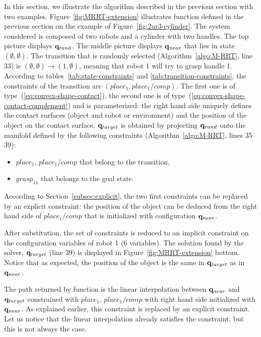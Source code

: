 In this section, we illustrate the algorithm described in the previous section with two examples. Figure~\ref{fig:MRRT-extension} illustrates function \EXTEND defined in the previous section on the example of Figure~\ref{fig:2ur3-cylinder}.
The system considered is
composed of two robots and a cylinder with two handles. The top picture displays
$\mathbf{q}_{rand}$. The middle picture displays $\mathbf{q}_{near}$ that lies in state
$(\emptyset,\emptyset)$. The transition that is randomly selected
(Algorithm~\ref{algo:M-RRT}, line 33) is
$(\emptyset,\emptyset) \rightarrow (1,\emptyset)$, meaning that robot 1 will
try to grasp handle 1. According to tables~\ref{tab:state-constraints} and
\ref{tab:transition-constraints}, the constraints of the transition are
$(place_1, place_1/comp)$.
The first one is of type~(\ref{eq:convex-shape-contact}), the second one is
of type~(\ref{eq:convex-shape-contact-complement}) and is parameterized: the
right hand side uniquely defines the contact surfaces (object and robot or environment) and the position of the
object on the contact surface. $\mathbf{q}_{target}$ is obtained by projecting $\mathbf{q}_{rand}$
onto the manifold defined by the following constraints
(Algorithm~\ref{algo:M-RRT}, lines 35--39):
\begin{itemize}
\item $place_1$, $place_1/comp$ that belong to the transition,
\item $grasp_{11}$ that belongs to the goal state.
\end{itemize}
According to Section~\ref{subsec:explicit}, the two first constraints can be
replaced by an explicit constraint: the position of the object can be deduced
from the right hand side of $place_1/comp$ that is initialized with configuration
$\mathbf{q}_{near}$.

After substitution, the set of constraints is reduced to an implicit constraint
on the configuration variables of robot 1 (6 variables). The solution found by the solver, $\mathbf{q}_{target}$ (line 39) is displayed in
Figure~\ref{fig:MRRT-extension} bottom. Notice that as expected, the position of the object is the same in $\mathbf{q}_{target}$ as in $\mathbf{q}_{near}$.

The path returned by function \EXTEND is the linear interpolation between
$\mathbf{q}_{near}$ and $\mathbf{q}_{target}$ constrained with $place_1$, $place_1/comp$ with
right hand side initialized with $\mathbf{q}_{near}$. As explained earlier, this
constraint is replaced by an explicit constraint. Let us notice that the linear interpolation already satisfies the constraint, but this is not always the case.

